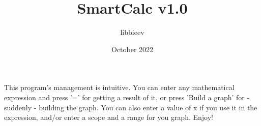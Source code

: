 \documentclass{article}
\title{SmartCalc v1.0}
\author{libbieev}
\date{October 2022}
\begin{document}
\maketitle

This program's management is intuitive. You can enter any mathematical expression and press '=' for getting a result of it, or press 'Build a graph' for - suddenly - building the graph. You can also enter a value of x if you use it in the expression, and/or enter a scope and a range for you graph. Enjoy!
\end{document}
